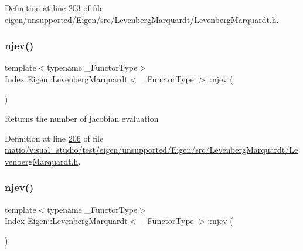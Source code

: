 Definition at line \hyperlink{eigen_2unsupported_2_eigen_2src_2_levenberg_marquardt_2_levenberg_marquardt_8h_source_l00203}{203} of file \hyperlink{eigen_2unsupported_2_eigen_2src_2_levenberg_marquardt_2_levenberg_marquardt_8h_source}{eigen/unsupported/\+Eigen/src/\+Levenberg\+Marquardt/\+Levenberg\+Marquardt.\+h}.

\mbox{\label{class_eigen_1_1_levenberg_marquardt_a31bedcc92106ed170fde5750559a62a5}} 
\subsubsection{\texorpdfstring{njev()}{njev()}\hspace{0.1cm}{\footnotesize\ttfamily [1/2]}}
{\footnotesize\ttfamily template$<$typename \+\_\+\+Functor\+Type$>$ \\
Index \hyperlink{class_eigen_1_1_levenberg_marquardt}{Eigen\+::\+Levenberg\+Marquardt}$<$ \+\_\+\+Functor\+Type $>$\+::njev (\begin{DoxyParamCaption}{ }\end{DoxyParamCaption})\hspace{0.3cm}{\ttfamily [inline]}}

\begin{DoxyReturn}{Returns}
the number of jacobian evaluation 
\end{DoxyReturn}


Definition at line \hyperlink{matio_2visual__studio_2test_2eigen_2unsupported_2_eigen_2src_2_levenberg_marquardt_2_levenberg_marquardt_8h_source_l00206}{206} of file \hyperlink{matio_2visual__studio_2test_2eigen_2unsupported_2_eigen_2src_2_levenberg_marquardt_2_levenberg_marquardt_8h_source}{matio/visual\+\_\+studio/test/eigen/unsupported/\+Eigen/src/\+Levenberg\+Marquardt/\+Levenberg\+Marquardt.\+h}.

\mbox{\label{class_eigen_1_1_levenberg_marquardt_a31bedcc92106ed170fde5750559a62a5}} 
\subsubsection{\texorpdfstring{njev()}{njev()}\hspace{0.1cm}{\footnotesize\ttfamily [2/2]}}
{\footnotesize\ttfamily template$<$typename \+\_\+\+Functor\+Type$>$ \\
Index \hyperlink{class_eigen_1_1_levenberg_marquardt}{Eigen\+::\+Levenberg\+Marquardt}$<$ \+\_\+\+Functor\+Type $>$\+::njev (\begin{DoxyParamCaption}{ }\end{DoxyParamCaption})\hspace{0.3cm}{\ttfamily [inline]}}

